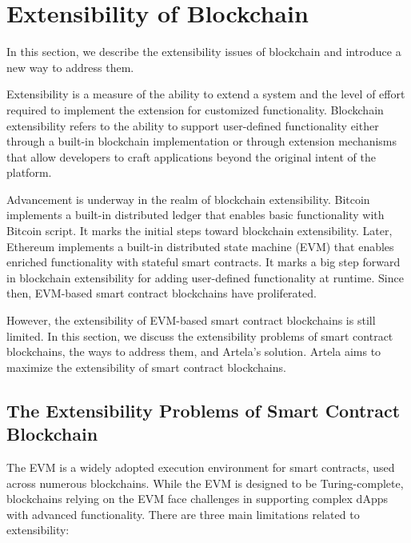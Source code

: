 
\section{Extensibility of Blockchain}

In this section, we describe the extensibility issues of blockchain and introduce a new way to address them. 

Extensibility\cite{johansson2009designing} is a measure of the ability to extend a system and the level of effort required to implement the extension for customized functionality. Blockchain extensibility\cite{garriga2021blockchain} refers to the ability to support user-defined functionality either through a built-in blockchain implementation or through extension mechanisms that allow developers to craft applications beyond the original intent of the platform.

Advancement is underway in the realm of blockchain extensibility. Bitcoin\cite{nakamoto2008bitcoin} implements a built-in distributed ledger that enables basic functionality with Bitcoin script. It marks the initial steps toward blockchain extensibility. Later, Ethereum\cite{buterin2014next} implements a built-in distributed state machine (EVM) that enables enriched functionality with stateful smart contracts. It marks a big step forward in blockchain extensibility for adding user-defined functionality at runtime. Since then, EVM-based smart contract blockchains have proliferated.

However, the extensibility of EVM-based smart contract blockchains is still limited. In this section, we discuss the extensibility problems of smart contract blockchains, the ways to address them, and Artela's solution. Artela aims to maximize the extensibility of smart contract blockchains.

\subsection{The Extensibility Problems of Smart Contract Blockchain}

The EVM is a widely adopted execution environment for smart contracts, used across numerous blockchains. While the EVM is designed to be Turing-complete, blockchains relying on the EVM face challenges in supporting complex dApps with advanced functionality. There are three main limitations related to extensibility:

